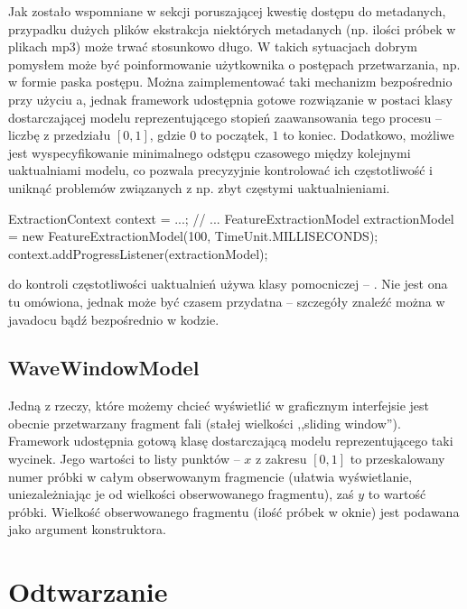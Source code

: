 Jak zostało wspomniane w sekcji poruszającej kwestię dostępu do metadanych, przypadku dużych plików
ekstrakcja niektórych metadanych (np. ilości próbek w plikach mp3) może trwać stosunkowo długo. W
takich sytuacjach dobrym pomysłem może być poinformowanie użytkownika o postępach przetwarzania, np.
w formie paska postępu. Można zaimplementować taki mechanizm bezpośrednio przy użyciu
a, jednak framework udostępnia gotowe rozwiązanie w postaci klasy
dostarczającej modelu reprezentującego stopień zaawansowania tego procesu -- liczbę z przedziału
$[0, 1]$, gdzie $0$ to początek, $1$ to koniec. Dodatkowo, możliwe jest wyspecyfikowanie minimalnego
odstępu czasowego między kolejnymi uaktualniami modelu, co pozwala precyzyjnie kontrolować ich
częstotliwość i uniknąć problemów związanych z np. zbyt częstymi uaktualnieniami.

\begin{java}
ExtractionContext context = ...;
// ...
FeatureExtractionModel extractionModel =
        new FeatureExtractionModel(100, TimeUnit.MILLISECONDS);
context.addProgressListener(extractionModel);
\end{java}

\begin{Tip}
 do kontroli częstotliwości uaktualnień używa klasy pomocniczej --
. Nie jest ona tu omówiona, jednak może być czasem przydatna --
szczegóły znaleźć można w javadocu bądź bezpośrednio w kodzie.
\end{Tip}

\section{WaveWindowModel}

Jedną z rzeczy, które możemy chcieć wyświetlić w graficznym interfejsie jest obecnie przetwarzany
fragment fali (stałej wielkości ,,sliding window''). Framework udostępnia gotową klasę dostarczającą
modelu reprezentującego taki wycinek. Jego wartości to listy punktów -- $x$ z zakresu $[0, 1]$ to
przeskalowany numer próbki w całym obserwowanym fragmencie (ułatwia wyświetlanie, uniezależniając je
od wielkości obserwowanego fragmentu), zaś $y$ to wartość próbki. Wielkość obserwowanego fragmentu
(ilość próbek w oknie) jest podawana jako argument konstruktora.

\chapter{Odtwarzanie}

